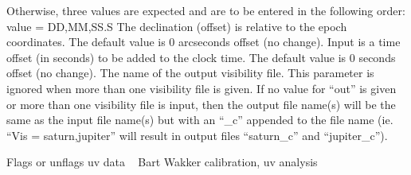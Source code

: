 {Otherwise, three values are expected and are to be entered in
the following order:
{\eightpoint\begintt
     value = DD,MM,SS.S
\endtt}
The declination (offset) is relative to the epoch coordinates.
The default value is 0 arcseconds offset (no change).
Input is a time offset (in seconds) to be added to the clock time.
The default value is 0 seconds offset (no change).
The name of the output visibility file.  This parameter is
ignored when more than one visibility file is given.  If no value
for ``out'' is given or more than one visibility file is input,
then the output file name(s) will be the same as the input file
name(s) but with an ``\_c'' appended to the file name
(ie. ``Vis = saturn,jupiter'' will result in output files ``saturn\_c''
and ``jupiter\_c'').
\par}
%
\noindent Flags or unflags uv data
\newline \ 
\newline {} Bart Wakker
\newline {} calibration, uv analysis
